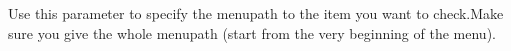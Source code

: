  Use this parameter to specify the menupath to the item you want to check.Make sure you give the whole menupath (start from the very beginning of the menu).
 



